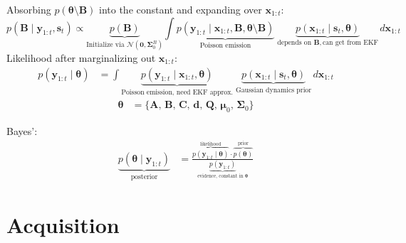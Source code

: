 \documentclass[11pt,letterpaper]{article} %
\begin{document}
Absorbing $p(\boldsymbol{\theta} \setminus \bm{B})$ into the constant and expanding over $\bm{x}_{1:t}$:
\begin{equation}
    p(\bm{B} \mid \bm{y}_{1:t}, \bm{s}_{t}) \propto 
        \underbrace{p(\bm{B})}_{\text{Initialize via }\mathcal{N}(\bm{0}, \boldsymbol{\Sigma}_0^B)} 
        \int 
        \underbrace{p(\bm{y}_{1:t} \mid \bm{x}_{1:t}, \boldsymbol{\bm{B}, \theta} \setminus \bm{B})}_{\text{Poisson emission}} \;
        \underbrace{p(\bm{x}_{1:t} \mid \bm{s}_{t}, \boldsymbol{\theta})}_{\text{depends on } \bm{B}, \text{can get from EKF}} 
        \, d\bm{x}_{1:t}
       \label{eq:posterior_B}
\end{equation}
Likelihood after marginalizing out $\bm{x}_{1:t}$:
\begin{align*}
    p(\bm{y}_{1:t} \mid \boldsymbol{\theta}) &= \int 
        \underbrace{p(\bm{y}_{1:t} \mid \bm{x}_{1:t}, \boldsymbol{\theta})}_{\text{Poisson emission, need EKF approx.}} \;
        \underbrace{p(\bm{x}_{1:t} \mid \bm{s}_{t}, \boldsymbol{\theta})}_{\text{Gaussian dynamics prior}} 
        \, d\bm{x}_{1:t}
\end{align*}
\begin{align*}
    \boldsymbol{\theta} &= \{\bm{A},\,\bm{B},\,\bm{C},\,
                             \bm{d},\,\bm{Q},\,\boldsymbol{\mu}_0,\,\boldsymbol{\Sigma}_0\}
\end{align*}

Bayes':
\begin{align*}
    \underbrace{p(\boldsymbol{\theta} \mid \bm{y}_{1:t})}_{\text{posterior}} &= \frac{
        \overbrace{p(\bm{y}_{1:t} \mid \boldsymbol{\theta})}^{\text{likelihood}} \cdot
        \overbrace{p(\boldsymbol{\theta})}^{\text{prior}}
    }{
        \underbrace{p(\bm{y}_{1:t})}_{\text{evidence, constant in } \boldsymbol{\theta}}
    }
\end{align*}

\clearpage
\section*{Acquisition}
\label{sec:RLS}
\end{document}
